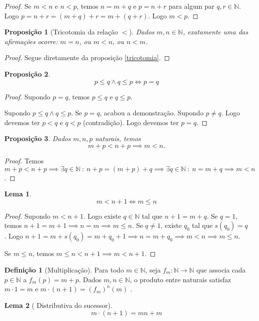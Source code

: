 \documentclass{article}
\theoremstyle{plain}
\newtheorem{prop}{Proposição}[section]
\newtheorem{lema}{Lema}
\theoremstyle{definition}
\newtheorem{definicao}{Definição}[section]
\theoremstyle{remark}
\begin{document}
\begin{proof}
	Se $m<n$ e $n<p$, temos $n = m+q$ e $p = n+r$ para algum par $q,r\in \mathbb{N}$. Logo $p = n +r = (m +q) +r =m +(q+r)$. Logo $m<p$.
\end{proof}
\begin{prop}[Tricotomia da relação $<$]
	Dados $m,n\in \mathbb{N}$, exatamente uma das afirmações ocorre: $m=n$, ou $m<n$, ou $n<m$.
\end{prop}
\begin{proof}
	Segue diretamente da proposição \ref{tricotomia}.
\end{proof}
\begin{prop}
	$$ p\leq q \land q \leq p \iff  p = q$$
\end{prop}
\begin{proof}
	Supondo $p = q$, temos $p\leq q $ e $q \leq p$. 

	Supondo $p\leq q \land q\leq p$. Se $p=q$, acabou a demonstração. Supondo $p\neq q$. Logo devemos ter $p <q $ e $q <p$ (contradição). Logo devemos ter $p=q$.

\end{proof}
\begin{prop}
	Dados $m,n,p$ naturais, temos $$m +p < n+p \implies m <n.$$
\end{prop}
\begin{proof}
	Temos $m+p < n+p \implies \exists q \in \mathbb{N} \: : \: n+p = (m+p) + q \implies  \exists q \in \mathbb{N} \: : \: n = m + q \implies m<n$.
\end{proof}
\begin{lema}
	\label{lemaDesigualdade}
	$$ m < n+1 \iff m \leq n$$
\end{lema}
\begin{proof}
	Supondo $m<n+1$. Logo existe $q\in \mathbb{N}$ tal que $n+1 = m+q$. Se $q = 1$, temos $n+1  = m+1 \implies n = m \implies m \leq n$. Se $q\neq 1$, existe $q_0$ tal que $s(q_0) = q$. Logo $n+1 = m+s(q_0) = m+q_0+1\implies n = m+q_0 \implies m< n \implies m \leq n$. 

	Se $m \leq n$, temos $m\leq n < n+1 \implies m<n+1$.
\end{proof}
\begin{definicao}[Multiplicação]
	Para todo $m\in \mathbb{N}$, seja $f_m : \mathbb{N} \to \mathbb{N}$ que associa cada $p\in \mathbb{N}$ a $f_m(p) = m+p$.
	Dados $m,n \in \mathbb{N}$, o produto entre naturais satisfaz $m\cdot 1 = m$ e  $ m\cdot (n+1) = (f_m)^n(m)$ .
\end{definicao}
\begin{lema}[ Distributiva do sucessor]
	$$m\cdot(n+1) = mn +m$$
\end{lema}
\end{document}
